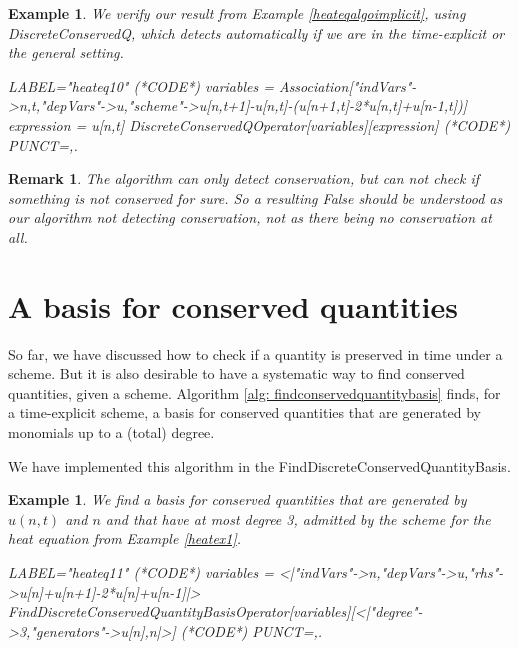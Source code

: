 \documentclass[sigconf,twocolumn]{acmart}
\newcommand{\1}{{\chi}}
\numberwithin{equation}{section}
\theoremstyle{thmlemcorr}
\numberwithin{theorem}{section}
\theoremstyle{thmlemcorr*}
\theoremstyle{defi}
\theoremstyle{remexample}
\newtheorem{remark}[theorem]{Remark}
\newtheorem{example}[theorem]{Example}
\theoremstyle{ass}
\begin{document}
	\begin{example}
		We verify our result from Example \ref{heateqalgoimplicit}, using {\sc DiscreteConservedQ}, which detects automatically if we are in the time-explicit or the general setting.
		\begin{EXE}
		LABEL="heateq10"
		(*CODE*)
		variables = Association["indVars"->{n,t},"depVars"->{u},"scheme"->{u[n,t+1]-u[n,t]-(u[n+1,t]-2*u[n,t]+u[n-1,t])}]
		expression = u[n,t]
		DiscreteConservedQOperator[variables][expression]
		(*CODE*)
		PUNCT={,.}
		\end{EXE}
		\begin{small}
		
		
		\end{small}
	\end{example}
\begin{remark}
	The algorithm can only detect conservation, but can not check if something is not conserved for sure. So a resulting {\sc False} should be understood as our algorithm not detecting conservation, not as there being no conservation at all.
\end{remark}
\section{A basis for conserved quantities}
\label{bfcq}
So far, we have discussed how to check if a quantity is preserved in time under a scheme. But it is also desirable to have a systematic way to find conserved quantities, given a scheme.
Algorithm \ref{alg: findconservedquantitybasis} finds, for a time-explicit scheme, a basis for conserved quantities that are generated by monomials up to a (total) degree. 

We have implemented this algorithm in the {\sc FindDiscreteConservedQuantityBasis}.
\begin{example}
	We find a basis for conserved quantities that are generated by $u(n,t)$ and $n$ and that have at most degree 3, admitted by the scheme for the heat equation from Example \ref{heatex1}.
	\begin{EXE}
		LABEL="heateq11"
		(*CODE*)
		variables = <|"indVars"->{n},"depVars"->{u},"rhs"->{u[n]+u[n+1]-2*u[n]+u[n-1]}|>
		FindDiscreteConservedQuantityBasisOperator[variables][<|"degree"->3,"generators"->{u[n],n}|>]
		(*CODE*)
		PUNCT={,.}
	\end{EXE}
	\begin{small}
		
		
	\end{small}
\end{example}
\end{document}

